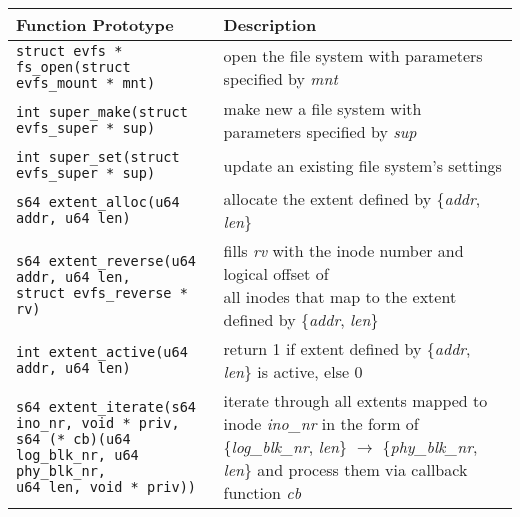 \begin{table*}
\begin{center}
\begin{small}
\begin{tabular}[t]{|l|l|}
\hline 
\textbf{Function Prototype} & \textbf{Description} \\
\hline
\hline
\texttt{struct evfs * fs\_open(struct evfs\_mount * mnt)} & open the file system with parameters specified by \textit{mnt} \\
\hline
\hline
\texttt{int super\_make(struct evfs\_super * sup)} & make new a file system with parameters specified by \textit{sup} \\
\hline
\texttt{int super\_set(struct evfs\_super * sup)} & update an existing file system's settings \\
\hline
\hline 
\texttt{s64 extent\_alloc(u64 addr, u64 len)} & allocate the extent defined by \{\textit{addr}, \textit{len}\} \\
\hline 
\makecell[l]{\texttt{s64 extent\_reverse(u64 addr, u64 len,} \\
\hspace{1em}\texttt{struct evfs\_reverse * rv)}} & \makecell[l]{fills \textit{rv} with the inode number and logical offset of \\ all inodes that map to the extent defined by \{\textit{addr}, \textit{len}\}} \\
\hline 
\texttt{int extent\_active(u64 addr, u64 len)} & return 1 if extent defined by \{\textit{addr}, \textit{len}\} is active, else 0 \\
\hline 
\makecell[l]{\texttt{s64 extent\_iterate(s64 ino\_nr, void * priv,} \\ 
\hspace{1em}\texttt{s64 (* cb)(u64 log\_blk\_nr, u64 phy\_blk\_nr,} \\
\hspace{6.25em}\texttt{u64 len, void * priv))}} & \makecell[l]{iterate through all extents mapped to inode \textit{ino\_nr} in \\ the form of \{\textit{log\_blk\_nr}, \textit{len}\} $\rightarrow$ \{\textit{phy\_blk\_nr}, \textit{len}\} \\ and process them via callback function \textit{cb}} \\

\end{tabular}
\end{small}
\end{center}
\end{table*}
